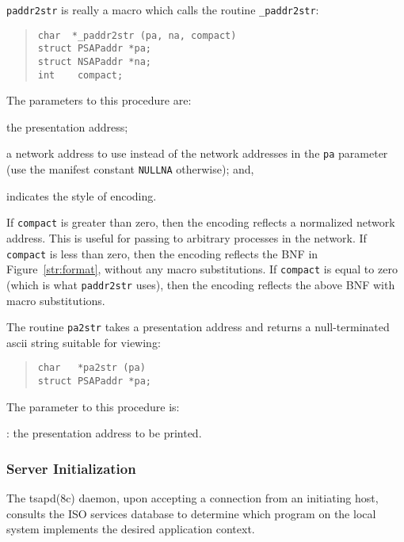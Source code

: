 \verb"paddr2str" is really a macro which calls the routine \verb"_paddr2str":
\begin{quote}\small\begin{verbatim}
char  *_paddr2str (pa, na, compact)
struct PSAPaddr *pa;
struct NSAPaddr *na;
int    compact;
\end{verbatim}\end{quote}
The parameters to this procedure are:
\begin{describe}
\item[\verb"pa":] the presentation address;

\item[\verb"na":] a network address to use instead of the network addresses
in the \verb"pa" parameter
(use the manifest constant \verb"NULLNA" otherwise);
and,

\item[\verb"compact":] indicates the style of encoding.
\end{describe}
If \verb"compact" is greater than zero,
then the encoding reflects a normalized network address.
This is useful for passing to arbitrary processes in the network.
If \verb"compact" is less than zero,
then the encoding reflects the BNF in Figure~\ref{str:format},
without any macro substitutions.
If \verb"compact" is equal to zero (which is what \verb"paddr2str" uses),
then the encoding reflects the above BNF with macro substitutions.

The routine \verb"pa2str" takes a presentation address and returns a
null-ter\-mi\-na\-ted ascii string suitable for viewing:
\begin{quote}\begin{verbatim}
char   *pa2str (pa)
struct PSAPaddr *pa;
\end{verbatim}\end{quote}
The parameter to this procedure is:
\begin{describe}
\item[\verb"pa"]: the presentation address to be printed.
\end{describe}

\subsubsection	{Server Initialization}
The \man tsapd(8c) daemon,
upon accepting a connection from an initiating host,
consults the ISO services database to determine which program
on the local system implements the desired application context.

